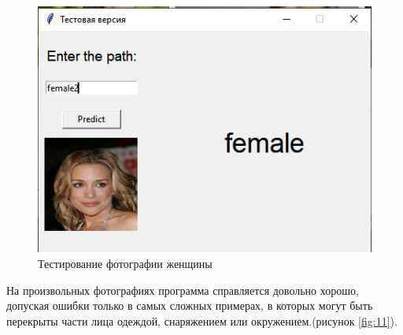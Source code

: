 \begin{figure}[!h] 
  \center
  \includegraphics [scale=1.2] {img/testfemale3.png}
  \caption{Тестирование фотографии женщины} 
  \label{fig:13}  
\end{figure}
\newpage
На произвольных фотографиях программа справляется довольно хорошо, допуская ошибки только в самых сложных примерах, в которых могут быть перекрыты части лица одеждой, снаряжением или окружением.(рисунок \ref{fig:11}).
